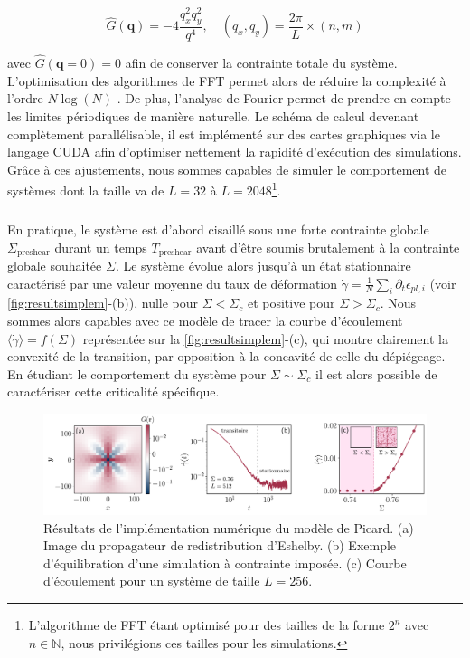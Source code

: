 \begin{equation}
	\hat{G}(\mathbf{q}) = -4\frac{q_x^2 q_y^2}{q^4}, \quad (q_x, q_y) = \frac{2\pi}{L} \times (n,m)
	\label{eq:eshelbydiscretfourier}
\end{equation}

\noindent avec $\hat{G}(\mathbf{q}=0) = 0$ afin de conserver la contrainte totale du système. L'optimisation des algorithmes de FFT permet alors de réduire la complexité à l'ordre $N\log(N)$ \cite{cooley_algorithm_1965}. De plus, l'analyse de Fourier permet de prendre en compte les limites périodiques de manière naturelle. Le schéma de calcul devenant complètement parallélisable, il est implémenté sur des cartes graphiques via le langage CUDA \cite{cuda} afin d'optimiser nettement la rapidité d'exécution des simulations. Grâce à ces ajustements, nous sommes capables de simuler le comportement de systèmes dont la taille va de $L=32$ à $L=2048$\footnote{L'algorithme de FFT étant optimisé pour des tailles de la forme $2^n$ avec $n\in\mathbb{N}$, nous privilégions ces tailles pour les simulations.}.

\subparagraph{}En pratique, le système est d'abord cisaillé sous une forte contrainte globale $\Sigma_\text{preshear}$ durant un temps $T_\text{preshear}$ avant d'être soumis brutalement à la contrainte globale souhaitée $\Sigma$. Le système évolue alors jusqu'à un état stationnaire caractérisé par une valeur moyenne du taux de déformation $ \dot{\gamma}  = \frac{1}{N}\sum_{i}\partial_t\epsilon_{pl,i}$ (voir \autoref{fig:resultsimplem}-(b)), nulle pour $\Sigma<\Sigma_c$ et positive pour $\Sigma>\Sigma_c$. Nous sommes alors capables avec ce modèle de tracer la courbe d'écoulement $\langle \dot{\gamma} \rangle = f(\Sigma)$ représentée sur la \autoref{fig:resultsimplem}-(c), qui montre clairement la convexité de la transition, par opposition à la concavité de celle du dépiégeage. En étudiant le comportement du système pour $\Sigma \sim \Sigma_c$ il est alors possible de caractériser cette criticalité spécifique.

\begin{figure}[h]
	\centering
	\includegraphics[width=\textwidth]{Chapitre4/Figures/Methode/ModeleResults.pdf}
	\caption{Résultats de l'implémentation numérique du modèle de Picard. (a) Image du propagateur de redistribution d'Eshelby. (b) Exemple d'équilibration d'une simulation à contrainte imposée. (c) Courbe d'écoulement pour un système de taille $L=256$.}
	\label{fig:resultsimplem}
\end{figure}


